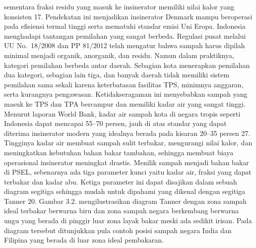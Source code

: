 \documentclass[
  letterpaper,
  DIV=11,
  numbers=noendperiod]{scrreprt}
\begin{document}
sementara fraksi residu yang masuk ke insinerator memiliki nilai kalor
yang konsisten 17. Pendekatan ini menjadikan insinerator Denmark mampu
beroperasi pada efisiensi termal tinggi serta mematuhi standar emisi Uni
Eropa. Indonesia menghadapi tantangan pemilahan yang sangat berbeda.
Regulasi pusat melalui UU No.~18/2008 dan PP 81/2012 telah mengatur
bahwa sampah harus dipilah minimal menjadi organik, anorganik, dan
residu. Namun dalam praktiknya, kategori pemilahan berbeda antar daerah.
Sebagian kota menerapkan pemilahan dua kategori, sebagian lain tiga, dan
banyak daerah tidak memiliki sistem pemilahan sama sekali karena
keterbatasan fasilitas TPS, minimnya anggaran, serta kurangnya
pengawasan. Ketidakseragaman ini menyebabkan sampah yang masuk ke TPS
dan TPA bercampur dan memiliki kadar air yang sangat tinggi. Menurut
laporan World Bank, kadar air sampah kota di negara tropis seperti
Indonesia dapat mencapai 55--70 persen, jauh di atas standar yang dapat
diterima insinerator modern yang idealnya berada pada kisaran 20--35
persen 27. Tingginya kadar air membuat sampah sulit terbakar, mengurangi
nilai kalor, dan meningkatkan kebutuhan bahan bakar tambahan, sehingga
membuat biaya operasional insinerator meningkat drastis. Menilik sampah
menjadi bahan bakar di PSEL, sebenarnya ada tiga parameter kunci yaitu
kadar air, fraksi yang dapat terbakar dan kadar abu. Ketiga parameter
ini dapat disajikan dalam sebuah diagram segitiga sehingga mudah untuk
dipahami yang dikenal dengan segitiga Tanner 20. Gambar 3.2.
mengilustrasikan diagram Tanner dengan zona sampah ideal terbakar
berwarna biru dan zona sampah negara berkembang berwarna ungu yang
berada di pinggir luar zona layak bakar meski ada sedikit irisan. Pada
diagram tersebut ditunjukkan pula contoh posisi sampah negara India dan
Filipina yang berada di luar zona ideal pembakaran.
\end{document}
